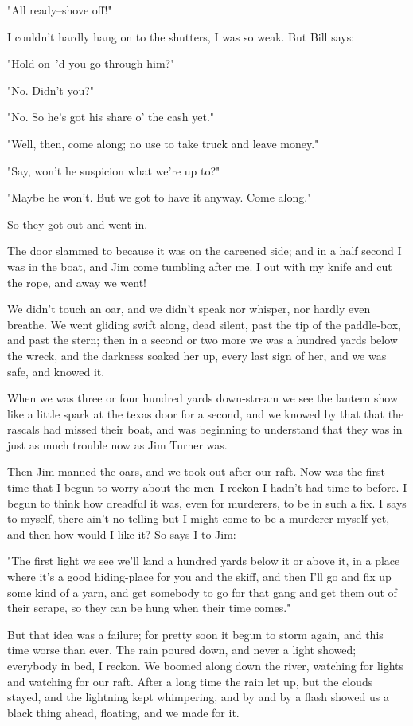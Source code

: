 "All ready--shove off!"

I couldn't hardly hang on to the shutters, I was so weak.  But Bill says:

"Hold on--'d you go through him?"

"No.  Didn't you?"

"No.  So he's got his share o' the cash yet."

"Well, then, come along; no use to take truck and leave money."

"Say, won't he suspicion what we're up to?"

"Maybe he won't.  But we got to have it anyway. Come along."

So they got out and went in.

The door slammed to because it was on the careened side; and in a half
second I was in the boat, and Jim come tumbling after me.  I out with my
knife and cut the rope, and away we went!

We didn't touch an oar, and we didn't speak nor whisper, nor hardly even
breathe.  We went gliding swift along, dead silent, past the tip of the
paddle-box, and past the stern; then in a second or two more we was a
hundred yards below the wreck, and the darkness soaked her up, every last
sign of her, and we was safe, and knowed it.

When we was three or four hundred yards down-stream we see the lantern
show like a little spark at the texas door for a second, and we knowed by
that that the rascals had missed their boat, and was beginning to
understand that they was in just as much trouble now as Jim Turner was.

Then Jim manned the oars, and we took out after our raft.  Now was the
first time that I begun to worry about the men--I reckon I hadn't had
time to before.  I begun to think how dreadful it was, even for
murderers, to be in such a fix.  I says to myself, there ain't no telling
but I might come to be a murderer myself yet, and then how would I like
it?  So says I to Jim:

"The first light we see we'll land a hundred yards below it or above it,
in a place where it's a good hiding-place for you and the skiff, and then
I'll go and fix up some kind of a yarn, and get somebody to go for that
gang and get them out of their scrape, so they can be hung when their
time comes."

But that idea was a failure; for pretty soon it begun to storm again, and
this time worse than ever.  The rain poured down, and never a light
showed; everybody in bed, I reckon.  We boomed along down the river,
watching for lights and watching for our raft.  After a long time the
rain let up, but the clouds stayed, and the lightning kept whimpering,
and by and by a flash showed us a black thing ahead, floating, and we
made for it.

